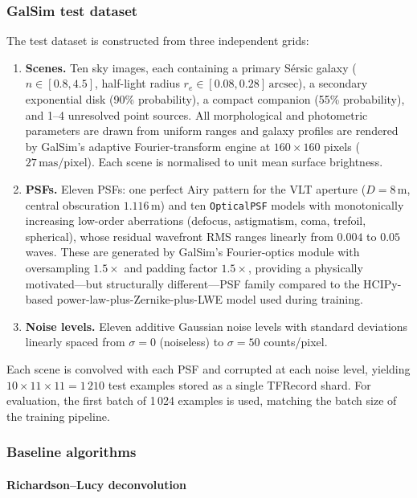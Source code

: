 \documentclass{aa}
\begin{document}
\subsubsection{GalSim test dataset}

The test dataset is constructed from three independent grids:
\begin{enumerate}
    \item \textbf{Scenes.} Ten sky images, each containing a primary Sérsic galaxy ($n \in [0.8, 4.5]$, half-light radius $r_e \in [0.08, 0.28]\,\mathrm{arcsec}$), a secondary exponential disk (90\% probability), a compact companion (55\% probability), and 1--4 unresolved point sources. All morphological and photometric parameters are drawn from uniform ranges and galaxy profiles are rendered by GalSim's adaptive Fourier-transform engine at $160 \times 160$ pixels ($27\,\mathrm{mas/pixel}$). Each scene is normalised to unit mean surface brightness.
    \item \textbf{PSFs.} Eleven PSFs: one perfect Airy pattern for the VLT aperture ($D = 8\,\mathrm{m}$, central obscuration $1.116\,\mathrm{m}$) and ten \texttt{OpticalPSF} models with monotonically increasing low-order aberrations (defocus, astigmatism, coma, trefoil, spherical), whose residual wavefront RMS ranges linearly from $0.004$ to $0.05$ waves. These are generated by GalSim's Fourier-optics module with oversampling $1.5\times$ and padding factor $1.5\times$, providing a physically motivated---but structurally different---PSF family compared to the HCIPy-based power-law-plus-Zernike-plus-LWE model used during training.
    \item \textbf{Noise levels.} Eleven additive Gaussian noise levels with standard deviations linearly spaced from $\sigma = 0$ (noiseless) to $\sigma = 50$ counts/pixel.
\end{enumerate}

Each scene is convolved with each PSF and corrupted at each noise level, yielding $10 \times 11 \times 11 = 1\,210$ test examples stored as a single TFRecord shard. For evaluation, the first batch of 1\,024 examples is used, matching the batch size of the training pipeline.

\subsubsection{Baseline algorithms}

\paragraph{Richardson--Lucy deconvolution}
\end{document}
